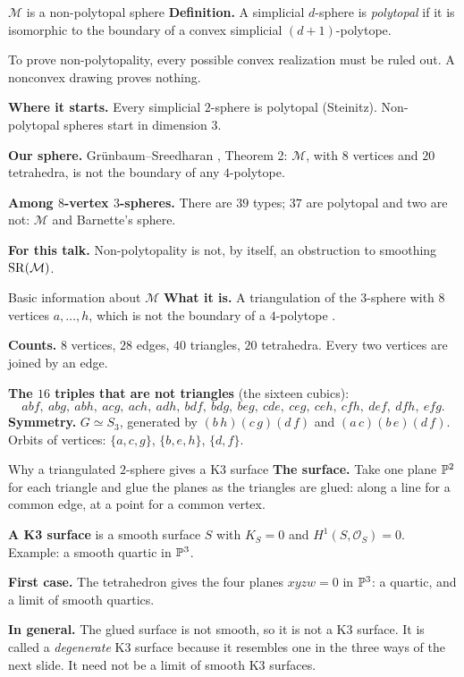 \begin{frame}{\(\mathcal M\) is a non-polytopal sphere}
\textbf{Definition.} A simplicial \(d\)-sphere is \emph{polytopal} if it is isomorphic to the boundary of a convex simplicial \((d+1)\)-polytope.
\par\smallskip
To prove non-polytopality, every possible convex realization must be ruled out. A nonconvex drawing proves nothing.
\par\smallskip
\textbf{Where it starts.} Every simplicial \(2\)-sphere is polytopal (Steinitz). Non-polytopal spheres start in dimension \(3\).
\par\smallskip
\textbf{Our sphere.} Grünbaum--Sreedharan \cite{GS}, Theorem 2: \(\mathcal M\), with \(8\) vertices and \(20\) tetrahedra, is not the boundary of any \(4\)-polytope.
\par\medskip
\textbf{Among \(8\)-vertex \(3\)-spheres.} There are \(39\) types; \(37\) are polytopal and two are not: \(\mathcal M\) and Barnette's sphere.
\par\medskip
\textbf{For this talk.} Non-polytopality is not, by itself, an obstruction to smoothing \(\operatorname{SR}(\mathcal M)\).
\end{frame}

\begin{frame}{Basic information about \(\mathcal M\)}
\textbf{What it is.} A triangulation of the \(3\)-sphere with \(8\) vertices \(a,\dots,h\), which is not the boundary of a \(4\)-polytope \cite{GS}.
\par\medskip
\textbf{Counts.} \(8\) vertices, \(28\) edges, \(40\) triangles, \(20\) tetrahedra. Every two vertices are joined by an edge.
\par\medskip
\textbf{The \(16\) triples that are not triangles} (the sixteen cubics):
\[
abf,\ abg,\ abh,\ acg,\ ach,\ adh,\ bdf,\ bdg,\ beg,\ cde,\ ceg,\ ceh,\ cfh,\ def,\ dfh,\ efg.
\]
\textbf{Symmetry.} \(G\simeq S_3\), generated by \((b\,h)(c\,g)(d\,f)\) and \((a\,c)(b\,e)(d\,f)\). Orbits of vertices: \(\{a,c,g\}\), \(\{b,e,h\}\), \(\{d,f\}\).
\end{frame}

\begin{frame}{Why a triangulated \(2\)-sphere gives a K3 surface}
\textbf{The surface.} Take one plane \(\mathbb P^2\) for each triangle and glue the planes as the triangles are glued: along a line for a common edge, at a point for a common vertex.
\par\medskip
\textbf{A K3 surface} is a smooth surface \(S\) with \(K_S=0\) and \(H^1(S,\mathcal O_S)=0\). Example: a smooth quartic in \(\mathbb P^3\).
\par\medskip
\textbf{First case.} The tetrahedron gives the four planes \(xyzw=0\) in \(\mathbb P^3\): a quartic, and a limit of smooth quartics.
\par\medskip
\textbf{In general.} The glued surface is not smooth, so it is not a K3 surface. It is called a \emph{degenerate} K3 surface because it resembles one in the three ways of the next slide. It need not be a limit of smooth K3 surfaces.
\end{frame}

